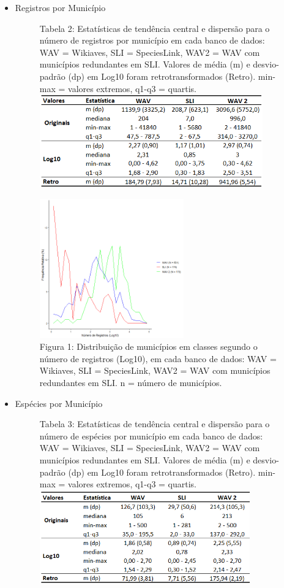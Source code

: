\begin{itemize}
    \item Registros por Município

\begin{figure}[h!]
\centering
{\scriptsize Tabela 2: Estatísticas de tendência central e dispersão para o número de registros por município em cada banco de dados: WAV = Wikiaves, SLI = SpeciesLink, WAV2 = WAV com municípios redundantes em SLI. Valores de média (m) e desvio-padrão (dp) em Log10 foram retrotransformados (Retro). min-max = valores extremos, q1-q3 = quartis.}
\includegraphics[height = 4cm]{Tabelas/2.png}
\end{figure}

\begin{figure}[h!]
\centering
\includegraphics[height = 6cm]{Imagens/113.png}
\\{\scriptsize Figura 1: Distribuição de municípios em classes segundo o número de registros (Log10), em cada banco de dados: WAV = Wikiaves, SLI = SpeciesLink, WAV2 = WAV com municípios redundantes em SLI. n = número de municípios.  }
\end{figure}


\item Espécies por Município

\begin{figure}[h!]
\centering
{\scriptsize Tabela 3: Estatísticas de tendência central e dispersão para o número de espécies por município em cada banco de dados: WAV = Wikiaves, SLI = SpeciesLink, WAV2 = WAV com municípios redundantes em SLI. Valores de média (m) e desvio-padrão (dp) em Log10 foram retrotransformados (Retro). min-max = valores extremos, q1-q3 = quartis.}
\includegraphics[height = 4cm]{Tabelas/3.png}
\end{figure}



\end{itemize}
